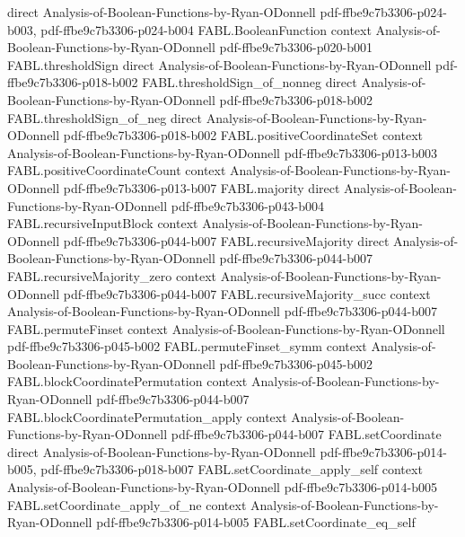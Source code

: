\begin{theorem}
  {direct}
  {Analysis-of-Boolean-Functions-by-Ryan-ODonnell}
  {pdf-ffbe9c7b3306-p024-b003,
    pdf-ffbe9c7b3306-p024-b004}
\proofstep
  {FABL.BooleanFunction}
  {context}
  {Analysis-of-Boolean-Functions-by-Ryan-ODonnell}
  {pdf-ffbe9c7b3306-p020-b001}
\proofstep
  {FABL.thresholdSign}
  {direct}
  {Analysis-of-Boolean-Functions-by-Ryan-ODonnell}
  {pdf-ffbe9c7b3306-p018-b002}
\proofstep
  {FABL.thresholdSign_of_nonneg}
  {direct}
  {Analysis-of-Boolean-Functions-by-Ryan-ODonnell}
  {pdf-ffbe9c7b3306-p018-b002}
\proofstep
  {FABL.thresholdSign_of_neg}
  {direct}
  {Analysis-of-Boolean-Functions-by-Ryan-ODonnell}
  {pdf-ffbe9c7b3306-p018-b002}
\proofstep
  {FABL.positiveCoordinateSet}
  {context}
  {Analysis-of-Boolean-Functions-by-Ryan-ODonnell}
  {pdf-ffbe9c7b3306-p013-b003}
\proofstep
  {FABL.positiveCoordinateCount}
  {context}
  {Analysis-of-Boolean-Functions-by-Ryan-ODonnell}
  {pdf-ffbe9c7b3306-p013-b007}
\proofstep
  {FABL.majority}
  {direct}
  {Analysis-of-Boolean-Functions-by-Ryan-ODonnell}
  {pdf-ffbe9c7b3306-p043-b004}
\proofstep
  {FABL.recursiveInputBlock}
  {context}
  {Analysis-of-Boolean-Functions-by-Ryan-ODonnell}
  {pdf-ffbe9c7b3306-p044-b007}
\proofstep
  {FABL.recursiveMajority}
  {direct}
  {Analysis-of-Boolean-Functions-by-Ryan-ODonnell}
  {pdf-ffbe9c7b3306-p044-b007}
\proofstep
  {FABL.recursiveMajority_zero}
  {context}
  {Analysis-of-Boolean-Functions-by-Ryan-ODonnell}
  {pdf-ffbe9c7b3306-p044-b007}
\proofstep
  {FABL.recursiveMajority_succ}
  {context}
  {Analysis-of-Boolean-Functions-by-Ryan-ODonnell}
  {pdf-ffbe9c7b3306-p044-b007}
\proofstep
  {FABL.permuteFinset}
  {context}
  {Analysis-of-Boolean-Functions-by-Ryan-ODonnell}
  {pdf-ffbe9c7b3306-p045-b002}
\proofstep
  {FABL.permuteFinset_symm}
  {context}
  {Analysis-of-Boolean-Functions-by-Ryan-ODonnell}
  {pdf-ffbe9c7b3306-p045-b002}
\proofstep
  {FABL.blockCoordinatePermutation}
  {context}
  {Analysis-of-Boolean-Functions-by-Ryan-ODonnell}
  {pdf-ffbe9c7b3306-p044-b007}
\proofstep
  {FABL.blockCoordinatePermutation_apply}
  {context}
  {Analysis-of-Boolean-Functions-by-Ryan-ODonnell}
  {pdf-ffbe9c7b3306-p044-b007}
\proofstep
  {FABL.setCoordinate}
  {direct}
  {Analysis-of-Boolean-Functions-by-Ryan-ODonnell}
  {pdf-ffbe9c7b3306-p014-b005,
    pdf-ffbe9c7b3306-p018-b007}
\proofstep
  {FABL.setCoordinate_apply_self}
  {context}
  {Analysis-of-Boolean-Functions-by-Ryan-ODonnell}
  {pdf-ffbe9c7b3306-p014-b005}
\proofstep
  {FABL.setCoordinate_apply_of_ne}
  {context}
  {Analysis-of-Boolean-Functions-by-Ryan-ODonnell}
  {pdf-ffbe9c7b3306-p014-b005}
\proofstep
  {FABL.setCoordinate_eq_self}

\end{theorem}
